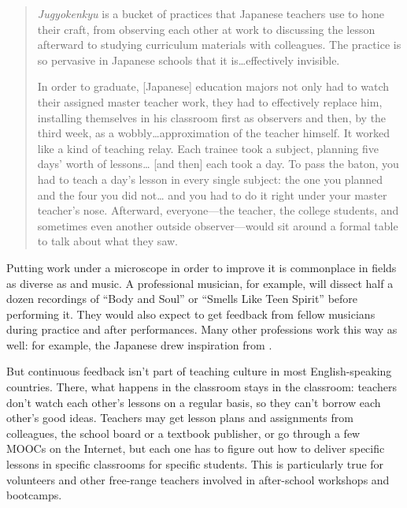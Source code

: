 \begin{quote}

  \emph{Jugyokenkyu} is a bucket of practices that Japanese teachers use to hone their craft,
  from observing each other at work
  to discussing the lesson afterward to studying curriculum materials with colleagues.
  The practice is so pervasive in Japanese schools that it is{\ldots}effectively invisible.

  In order to graduate,
  [Japanese] education majors not only had to watch their assigned master teacher work,
  they had to effectively replace him,
  installing themselves in his classroom first as observers and then,
  by the third week,
  as a wobbly{\ldots}approximation of the teacher himself.
  It worked like a kind of teaching relay.
  Each trainee took a subject,
  planning five days' worth of lessons{\ldots} [and then] each took a day.
  To pass the baton,
  you had to teach a day's lesson in every single subject:
  the one you planned and the four you did not{\ldots}
  and you had to do it right under your master teacher's nose.
  Afterward, everyone---the teacher, the college students,
  and sometimes even another outside observer---would sit around a formal table
  to talk about what they saw.

\end{quote}

Putting work under a microscope in order to improve it is commonplace
in fields as diverse as  and music.
A professional musician,
for example,
will dissect half a dozen recordings of ``Body and Soul'' or ``Smells Like Teen Spirit'' before performing it.
They would also expect to get feedback from fellow musicians during practice and after performances.
Many other professions work this way as well: for
example, the Japanese drew inspiration from .

But continuous feedback isn't part of teaching culture in most English-speaking countries.
There,
what happens in the classroom stays in the classroom:
teachers don't watch each other's lessons on a regular basis,
so they can't borrow each other's good ideas.
Teachers may get lesson plans and assignments from colleagues,
the school board or a textbook publisher,
or go through a few MOOCs on the Internet,
but each one has to figure out
how to deliver specific lessons in specific classrooms for specific students.
This is particularly true for volunteers and other free-range teachers
involved in after-school workshops and bootcamps.

